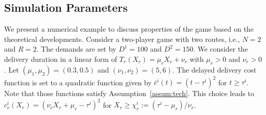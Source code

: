 \documentclass[letterpaper, 10 pt, conference]{ieeeconf}  %
\begin{document}
\subsection{Simulation Parameters}
We present a numerical example to discuss properties of the game based on the theoretical developments.
Consider a two-player game with two routes, i.e., $N=2$ and $R=2$.
The demands are set by $D^1=100$ and $D^2=150$.
We consider the delivery duration in a linear form of $T_r(X_r)=\mu_r X_r+\nu_r$ with $\mu_r>0$ and $\nu_r>0$.
Let $(\mu_1,\mu_2)=(0.3,0.5)$ and $(\nu_1,\nu_2)=(5,6)$.
The delayed delivery cost function is set to a quadratic function given by $\bar{c}^i(t)=(t-\tau^i)^2$ for $t\geq \tau^i$.
Note that those functions satisfy Assumption~\ref{assum:tech}.
This choice leads to $c^i_r(X_r)=(\nu_r X_r + \mu_r - \tau^i)^2$ for $X_r\geq \chi^i_r:= (\tau^i-\mu_r)/\nu_r$.
\end{document}
